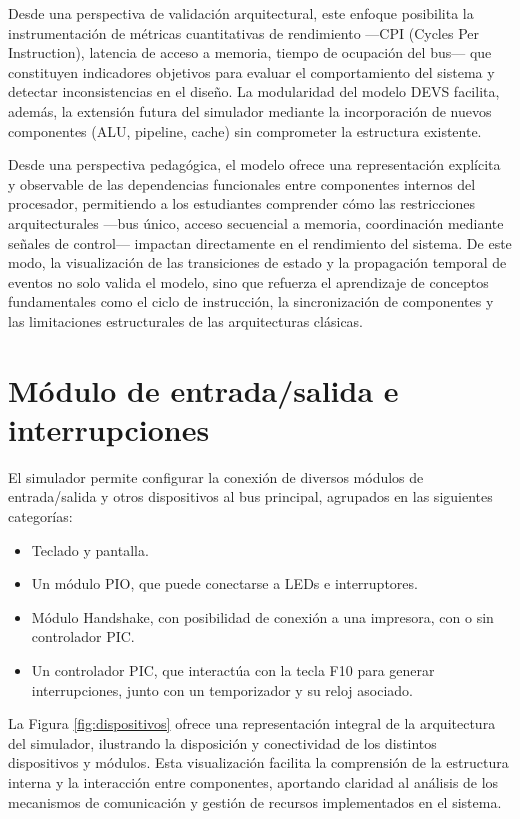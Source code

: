 \documentclass[12pt,oneside]{templates/unerthesis}
\begin{document}
Desde una perspectiva de validación arquitectural, este enfoque posibilita la instrumentación de métricas cuantitativas de rendimiento ---CPI (Cycles Per Instruction), latencia de acceso a memoria, tiempo de ocupación del bus--- que constituyen indicadores objetivos para evaluar el comportamiento del sistema y detectar inconsistencias en el diseño. La modularidad del modelo DEVS facilita, además, la extensión futura del simulador mediante la incorporación de nuevos componentes (ALU, pipeline, cache) sin comprometer la estructura existente.

Desde una perspectiva pedagógica, el modelo ofrece una representación explícita y observable de las dependencias funcionales entre componentes internos del procesador, permitiendo a los estudiantes comprender cómo las restricciones arquitecturales ---bus único, acceso secuencial a memoria, coordinación mediante señales de control--- impactan directamente en el rendimiento del sistema. De este modo, la visualización de las transiciones de estado y la propagación temporal de eventos no solo valida el modelo, sino que refuerza el aprendizaje de conceptos fundamentales como el ciclo de instrucción, la sincronización de componentes y las limitaciones estructurales de las arquitecturas clásicas.

\hypertarget{muxf3dulo-de-entradasalida-e-interrupciones}{%
\section{Módulo de entrada/salida e interrupciones}\label{muxf3dulo-de-entradasalida-e-interrupciones}}

El simulador permite configurar la conexión de diversos módulos de entrada/salida y otros dispositivos al bus principal, agrupados en las siguientes categorías:

\begin{itemize}
\item
  Teclado y pantalla.
\item
  Un módulo PIO, que puede conectarse a LEDs e interruptores.
\item
  Módulo Handshake, con posibilidad de conexión a una impresora, con o sin controlador PIC.
\item
  Un controlador PIC, que interactúa con la tecla F10 para generar interrupciones, junto con un temporizador y su reloj asociado.
\end{itemize}

La Figura \ref{fig:dispositivos} ofrece una representación integral de la arquitectura del simulador, ilustrando la disposición y conectividad de los distintos dispositivos y módulos. Esta visualización facilita la comprensión de la estructura interna y la interacción entre componentes, aportando claridad al análisis de los mecanismos de comunicación y gestión de recursos implementados en el sistema.
\end{document}
